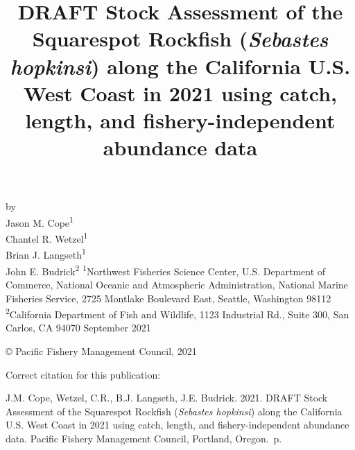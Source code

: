 \documentclass[11pt,
  english,
  a4paper,
]{article}
\date{}
\newcommand{\trTitle}{DRAFT Stock Assessment of the Squarespot Rockfish (\emph{Sebastes hopkinsi}) along the California U.S. West Coast in 2021 using catch, length, and fishery-independent abundance data}
\newcommand{\trYear}{2021}
\newcommand{\trMonth}{September}
\newcommand{\trAuthsBack}{J.M. Cope, Wetzel, C.R., B.J. Langseth, J.E. Budrick}
\newcommand{\trCitation}{
\begin{hangparas}{1em}{1}
\trAuthsBack{}. \trYear{}. \trTitle{}. Pacific Fishery Management Council, Portland, Oregon. \pageref{LastPage}{}\,p.
\end{hangparas}}
\begin{document}

\renewcommand*{\thefootnote}{\fnsymbol{footnote}}

\small
\thispagestyle{empty}
\noindent
\begin{center}
\title{DRAFT Stock Assessment of the Squarespot Rockfish (\emph{Sebastes hopkinsi}) along the California U.S. West Coast in 2021 using catch, length, and fishery-independent abundance data}
\vspace{1.5cm}
{\Large\textbf{}}
\vfill
by\\
Jason M. Cope\textsuperscript{1}\\
Chantel R. Wetzel\textsuperscript{1}\\
Brian J. Langseth\textsuperscript{1}\\
John E. Budrick\textsuperscript{2}\vfill
\textsuperscript{1}Northwest Fisheries Science Center, U.S. Department of Commerce, National Oceanic and Atmospheric Administration, National Marine Fisheries Service, 2725 Montlake Boulevard East, Seattle, Washington 98112\\
\textsuperscript{2}California Department of Fish and Wildlife, 1123 Industrial Rd., Suite 300, San Carlos, CA 94070\vfill
\trMonth{} \trYear{}
\end{center}
\clearpage

\thispagestyle{empty}
\vspace*{\fill}
\begin{center}
\copyright{} Pacific Fishery Management Council, \trYear{}\\
\end{center}
\par
\bigskip
\noindent
Correct citation for this publication:
\bigskip
\par
\trCitation{}
\clearpage


\tableofcontents\clearpage
\label{TRlastRoman}
\clearpage

\newpage
\thispagestyle{empty} %
\end{document}
